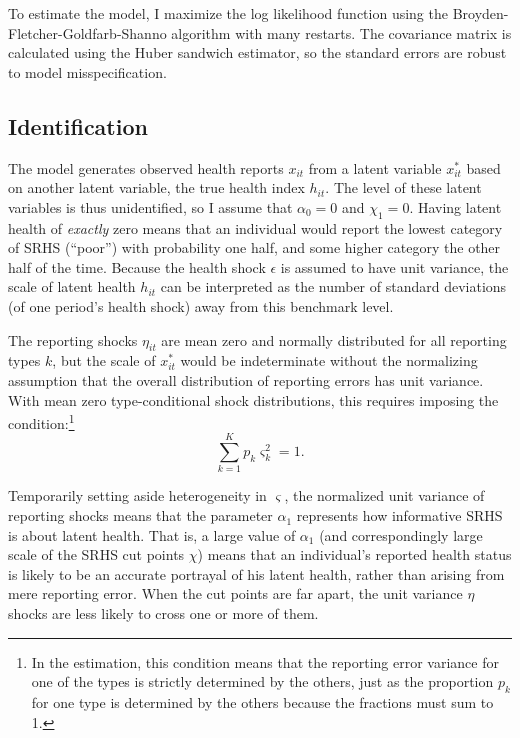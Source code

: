 \documentclass[12pt,pdftex,letterpaper]{article}
\newcommand{\Health}{h}
\newcommand{\Report}{x}
\newcommand{\Cut}{\chi}
\newcommand{\LatentParam}{\alpha}
\newcommand{\HealthShock}{\epsilon}
\newcommand{\ReportShock}{\eta}
\newcommand{\TypeProb}{p}
\newcommand{\ReportStd}{\varsigma}
\begin{document}
To estimate the model, I maximize the log likelihood function using the Broyden-Fletcher-Goldfarb-Shanno algorithm with many restarts. The covariance matrix is calculated using the Huber sandwich estimator, so the standard errors are robust to model misspecification.


\subsection{Identification}\label{sec:Identification}

The model generates observed health reports $\Report_{it}$ from a latent variable $\Report^*_{it}$ based on another latent variable, the true health index $\Health_{it}$.  The level of these latent variables is thus unidentified, so I assume that $\LatentParam_0=0$ and $\Cut_1=0$.  Having latent health of \textit{exactly} zero means that an individual would report the lowest category of SRHS (``poor'') with probability one half, and some higher category the other half of the time.  Because the health shock $\HealthShock$ is assumed to have unit variance, the scale of latent health $\Health_{it}$ can be interpreted as the number of standard deviations (of one period's health shock) away from this benchmark level.

The reporting shocks $\ReportShock_{it}$ are mean zero and normally distributed for all reporting types $k$, but the scale of $\Report_{it}^*$ would be indeterminate without the normalizing assumption that the overall distribution of reporting errors has unit variance. With mean zero type-conditional shock distributions, this requires imposing the condition:\footnote{In the estimation, this condition means that the reporting error variance for one of the types is strictly determined by the others, just as the proportion $\TypeProb_k$ for one type is determined by the others because the fractions must sum to 1.}
\begin{equation}
\sum_{k=1}^K \TypeProb_k \ReportStd_k^2 = 1.
\end{equation}

Temporarily setting aside heterogeneity in $\ReportStd$, the normalized unit variance of reporting shocks means that the parameter $\LatentParam_1$ represents how informative SRHS is about latent health. That is, a large value of $\LatentParam_1$ (and correspondingly large scale of the SRHS cut points $\Cut$) means that an individual's reported health status is likely to be an accurate portrayal of his latent health, rather than arising from mere reporting error. When the cut points are far apart, the unit variance $\ReportShock$ shocks are less likely to cross one or more of them.
\end{document}
